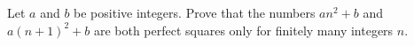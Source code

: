 Let $a$ and $b$ be positive integers. Prove that the numbers $an^2+b$ and $a(n+1)^2+b$ are both perfect squares only for finitely many integers $n$.
